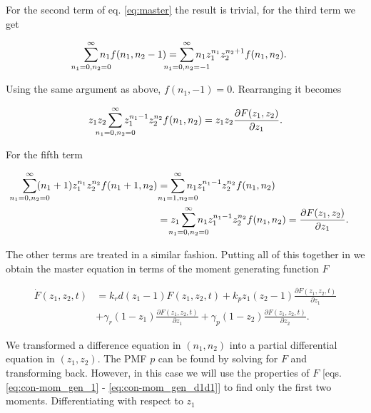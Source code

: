 For the second term of eq. \eqref{eq:master} the result is trivial, for the third term we get

\begin{equation*}
  \sum_{\mathclap{n_1=0,n_2=0}}^\infty n_1f(n_1,n_2-1) = \sum_{\mathclap{n_1=0,n_2=-1}}^\infty n_1z_1^{n_1}z_2^{n_2+1}f(n_1,n_2).
\end{equation*}

Using the same argument as above, $f(n_1,-1) = 0$. Rearranging it becomes

\begin{equation*}
  z_1 z_2 \sum_{\mathclap{n_1=0,n_2=0}}^\infty z_1^{n_1-1}z_2^{n_2}f(n_1,n_2) = z_1 z_2 \frac{\partial F(z_1,z_2)}{\partial z_1}.
\end{equation*}

For the fifth term

\begin{equation*}
  \begin{split}
    \sum_{\mathclap{n_1=0,n_2=0}}^\infty (n_1+1)z_1^{n_1}z_2^{n_2}f(n_1+1,n_2) &= \sum_{\mathclap{n_1=1,n_2=0}}^\infty n_1z_1^{n_1-1}z_2^{n_2}f(n_1,n_2)\\ 
    &= z_1 \sum_{\mathclap{n_1=0,n_2=0}}^\infty n_1z_1^{n_1-1}z_2^{n_2}f(n_1,n_2) = \frac{\partial F(z_1,z_2)}{\partial z_1}.
  \end{split}
\end{equation*}

The other terms are treated in a similar fashion. Putting all of this together in we obtain the master equation in terms of the moment generating function $F$

\begin{equation}
  \label{eq:masterF}
  \begin{split}
    \dot{F}(z_1,z_2,t) &= k_rd(z_1-1)F(z_1,z_2,t) + k_pz_1(z_2-1)\frac{\partial F(z_1,z_2,t)}{\partial z_1} \\
    &+ \gamma_r(1-z_1)\frac{\partial F(z_1,z_2,t)}{\partial z_1} + \gamma_p(1-z_2)\frac{\partial F(z_1,z_2,t)}{\partial z_2}.
  \end{split}
\end{equation}

We transformed a difference equation in $(n_1,n_2)$ into a partial differential equation in $(z_1,z_2)$. The PMF $p$ can be found by solving for $F$ and transforming back. However, in this case we will use the properties of $F$ [eqs. \eqref{eq:con-mom_gen_1} - \eqref{eq:con-mom_gen_d1d1}] to find only the first two moments. Differentiating with respect to $z_1$

